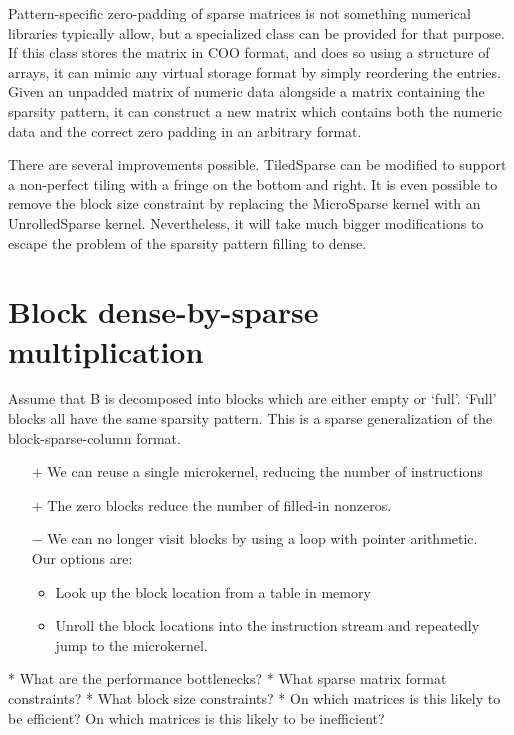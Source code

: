 Pattern-specific zero-padding of sparse matrices is not something numerical libraries typically allow, but a specialized class can be provided for that purpose. If this class stores the matrix in COO format, and does so using a structure of arrays, it can mimic any virtual storage format by simply reordering the entries. Given an unpadded matrix of numeric data alongside a matrix containing the sparsity pattern, it can construct a new matrix which contains both the numeric data and the correct zero padding in an arbitrary format. 

There are several improvements possible. TiledSparse can be modified to support a non-perfect tiling with a fringe on the bottom and right. It is even possible to remove the block size constraint by replacing the MicroSparse kernel with an UnrolledSparse kernel. Nevertheless, it will take much bigger modifications to escape the problem of the sparsity pattern filling to dense.


\section{Block dense-by-sparse multiplication}

  Assume that B is decomposed into blocks which are either empty or `full'. `Full' blocks all have the same sparsity pattern. This is a sparse generalization of the block-sparse-column format.

  \begin{itemize}
  \item[$+$] We can reuse a single microkernel, reducing the number of instructions
  \item[$+$] The zero blocks reduce the number of filled-in nonzeros.
  \item[$-$] We can no longer visit blocks by using a loop with pointer arithmetic. \\Our options are:
    \begin{itemize}
    \item Look up the block location from a table in memory
    \item Unroll the block locations into the instruction stream and repeatedly jump to the microkernel.
    \end{itemize}
  \end{itemize}




* What are the performance bottlenecks?
* What sparse matrix format constraints?
* What block size constraints?
* On which matrices is this likely to be efficient? On which matrices is this likely to be inefficient?


